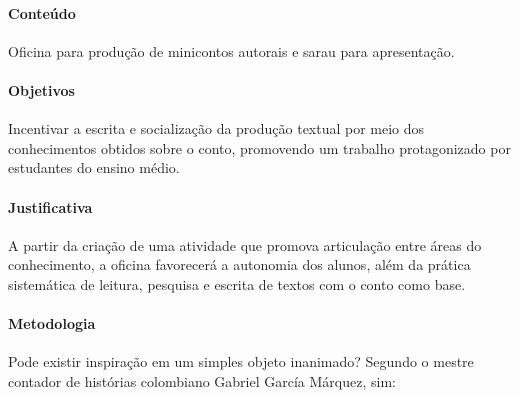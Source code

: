 \documentclass[11pt]{extarticle}
\begin{document}

\paragraph{Conteúdo}
Oficina para produção de minicontos autorais e sarau para apresentação.

\paragraph{Objetivos}
Incentivar a escrita e socialização da produção textual por meio dos
conhecimentos obtidos sobre o conto, promovendo um trabalho
protagonizado por estudantes do ensino médio.

\paragraph{Justificativa}
A partir da criação de uma atividade que promova articulação entre áreas
do conhecimento, a oficina favorecerá a autonomia dos alunos, além da
prática sistemática de leitura, pesquisa e escrita de textos com o conto
como base.

\paragraph{Metodologia}
Pode existir inspiração em um simples objeto inanimado? Segundo o mestre
contador de histórias colombiano Gabriel García Márquez, sim:
\end{document}
